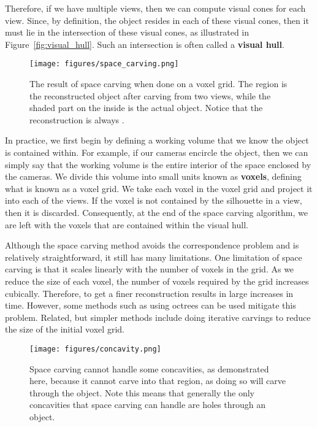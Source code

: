 \documentclass[a4paper, 12pt]{article}
\renewcommand\emph{\textbf}
\numberwithin{equation}{section}
\begin{document}
Therefore, if we have multiple views, then we can compute visual cones for each view. Since, by definition, the object resides in each of these visual cones, then it must lie in the intersection of these visual cones, as illustrated in Figure~\ref{fig:visual_hull}. Such an intersection is often called a \emph{visual hull}. 

\begin{figure}[h!]
    \centering
    \texttt{[image: figures/space\_carving.png]}
    \caption{The result of space carving when done on a voxel grid. The region is the reconstructed object after carving from two views, while the shaded part on the inside is the actual object. Notice that the reconstruction is always 
    .}
    \label{fig:space_carving}
\end{figure}

In practice, we first begin by defining a working volume that we know the object is contained within. For example, if our cameras encircle the object, then we can simply say that the working volume is the entire interior of the space enclosed by the cameras. We divide this volume into small units known as \emph{voxels}, defining what is known as a voxel grid. We take each voxel in the voxel grid and project it into each of the views. If the voxel is not contained by the silhouette in a view, then it is discarded. Consequently, at the end of the space carving algorithm, we are left with the voxels that are contained within the visual hull.

Although the space carving method avoids the correspondence problem and is relatively straightforward, it still has many limitations. One limitation of space carving is that it scales linearly with the number of voxels in the grid. As we reduce the size of each voxel, the number of voxels required by the grid increases cubically. Therefore, to get a finer reconstruction results in large increases in time. However, some methods such as using octrees can be used mitigate this problem. Related, but simpler methods include doing iterative carvings to reduce the size of the initial voxel grid. 

\begin{figure}[h!]
    \centering
    \texttt{[image: figures/concavity.png]}
    \caption{Space carving cannot handle some concavities, as demonstrated here, because it cannot carve into that region, as doing so will carve through the object. Note this means that generally the only concavities that space carving can handle are holes through an object. }
    \label{fig:concavity}
\end{figure}
\end{document}
